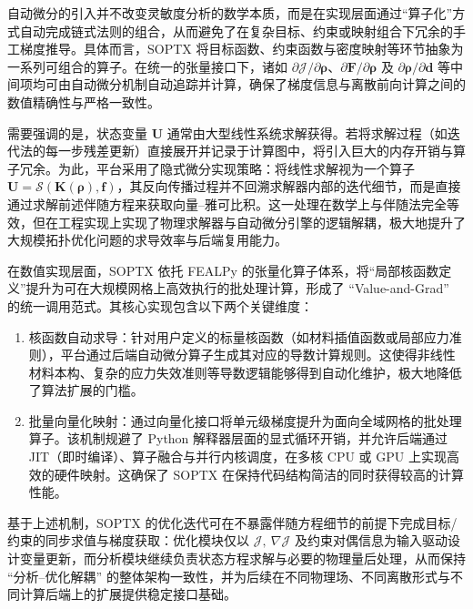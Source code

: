 自动微分的引入并不改变灵敏度分析的数学本质，而是在实现层面通过“算子化”方式自动完成链式法则的组合，从而避免了在复杂目标、约束或映射组合下冗余的手工梯度推导。具体而言，SOPTX 将目标函数、约束函数与密度映射等环节抽象为一系列可组合的算子。在统一的张量接口下，诸如 $\partial \mathcal{J}/\partial \boldsymbol{\rho}$、$\partial \boldsymbol{F}/\partial \boldsymbol{\rho}$ 及 $\partial \boldsymbol{\rho}/\partial \boldsymbol{d}$ 等中间项均可由自动微分机制自动追踪并计算，确保了梯度信息与离散前向计算之间的数值精确性与严格一致性。

需要强调的是，状态变量 $\boldsymbol{U}$ 通常由大型线性系统求解获得。若将求解过程（如迭代法的每一步残差更新）直接展开并记录于计算图中，将引入巨大的内存开销与算子冗余。为此，平台采用了隐式微分实现策略：将线性求解视为一个算子 $\boldsymbol{U} = \mathcal{S}(\boldsymbol{K}(\boldsymbol{\rho}), \boldsymbol{f})$，其反向传播过程并不回溯求解器内部的迭代细节，而是直接通过求解前述伴随方程来获取向量--雅可比积。这一处理在数学上与伴随法完全等效，但在工程实现上实现了物理求解器与自动微分引擎的逻辑解耦，极大地提升了大规模拓扑优化问题的求导效率与后端复用能力。

在数值实现层面，SOPTX 依托 FEALPy 的张量化算子体系，将“局部核函数定义”提升为可在大规模网格上高效执行的批处理计算，形成了 “Value-and-Grad” 的统一调用范式。其核心实现包含以下两个关键维度：
\begin{enumerate}[
	label={（\arabic*）},
	labelsep=0.25em,
	leftmargin=3.2em,
	itemsep=0.4em,
	topsep=0.4em,
	parsep=0pt,
	partopsep=0pt
	]
	\item 核函数自动求导：针对用户定义的标量核函数（如材料插值函数或局部应力准则），平台通过后端自动微分算子生成其对应的导数计算规则。这使得非线性材料本构、复杂的应力失效准则等导数逻辑能够得到自动化维护，极大地降低了算法扩展的门槛。

	\item 批量向量化映射：通过向量化接口将单元级梯度提升为面向全域网格的批处理算子。该机制规避了 Python 解释器层面的显式循环开销，并允许后端通过 JIT（即时编译）、算子融合与并行内核调度，在多核 CPU 或 GPU 上实现高效的硬件映射。这确保了 SOPTX 在保持代码结构简洁的同时获得较高的计算性能。
\end{enumerate}
基于上述机制，SOPTX 的优化迭代可在不暴露伴随方程细节的前提下完成目标/约束的同步求值与梯度获取：优化模块仅以  $\mathcal{J},\ \nabla\mathcal{J}$ 及约束对偶信息为输入驱动设计变量更新，而分析模块继续负责状态方程求解与必要的物理量后处理，从而保持 “分析--优化解耦” 的整体架构一致性，并为后续在不同物理场、不同离散形式与不同计算后端上的扩展提供稳定接口基础。


